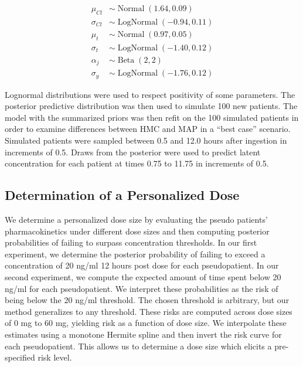 \begin{align}
	\mu_{Cl} &\sim \operatorname{Normal}(1.64, 0.09)  \label{eq:eq_18} \\
	\sigma_{Cl} &\sim \operatorname{LogNormal}(-0.94, 0.11)  \label{eq:eq_19} \\
	\mu_{t} &\sim \operatorname{Normal}(0.97, 0.05)   \label{eq:eq_20} \\
	\sigma_{t} &\sim \operatorname{LogNormal}(-1.40, 0.12)  \label{eq:eq_21} \\
	\alpha_j &\sim \operatorname{Beta}(2,2)  \label{eq:eq_22} \\
	\sigma_y &\sim \operatorname{LogNormal}(-1.76, 0.12)  \label{eq:eq_23}
\end{align}

\noindent Lognormal distributions were used to respect positivity of some parameters.   The posterior predictive distribution was then used to simulate 100 new patients.  The model with the summarized priors was then refit on the 100 simulated patients in order to examine differences between HMC and MAP in a “best case” scenario. Simulated patients were sampled between 0.5 and 12.0 hours after ingestion in increments of 0.5. Draws from the posterior were used to predict latent concentration for each patient at times 0.75 to 11.75 in increments of 0.5.

\subsection*{Determination of a Personalized Dose}

We determine a personalized dose size by evaluating the pseudo patients’ pharmacokinetics under different dose sizes and then computing posterior probabilities of failing to surpass concentration thresholds.  In our first experiment, we determine the posterior probability of failing to exceed a concentration of 20 ng/ml 12 hours post dose for each pseudopatient.  In our second experiment, we compute the expected amount of time spent below 20 ng/ml for each pseudopatient.  We interpret these probabilities as the risk of being below the 20 ng/ml threshold.  The chosen threshold is arbitrary, but our method generalizes to any threshold.  These risks are computed across dose sizes of 0 mg to 60 mg, yielding risk as a function of dose size.  We interpolate these estimates using a monotone Hermite spline and then invert the risk curve for each pseudopatient.  This allows us to determine a dose size which elicits a pre-specified risk level.

